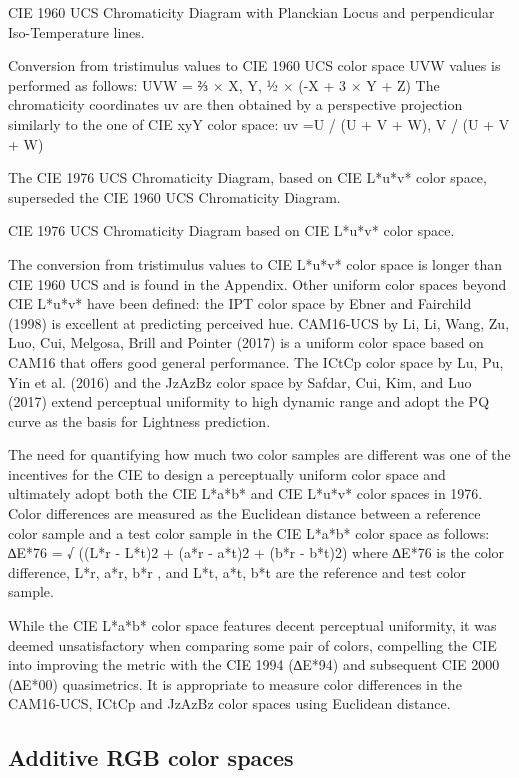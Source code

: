 CIE 1960 UCS Chromaticity Diagram with Planckian Locus and perpendicular Iso-Temperature lines.

Conversion from tristimulus values to CIE 1960 UCS color space UVW values is performed as follows:
UVW = ⅔ × X, Y, ½ × (-X + 3 × Y + Z)
The chromaticity coordinates uv are then obtained by a perspective projection similarly to the one of CIE xyY color space:
uv =U / (U + V + W), V / (U + V + W)

The CIE 1976 UCS Chromaticity Diagram, based on CIE L*u*v* color space, superseded the CIE 1960 UCS Chromaticity Diagram.

CIE 1976 UCS Chromaticity Diagram based on CIE L*u*v* color space.

The conversion from tristimulus values to CIE L*u*v* color space is longer than CIE 1960 UCS and is found in the Appendix.
Other uniform color spaces beyond CIE L*u*v* have been defined: the IPT color space by Ebner and Fairchild (1998) is excellent at predicting perceived hue. CAM16-UCS by Li, Li, Wang, Zu, Luo, Cui, Melgosa, Brill and Pointer (2017) is a uniform color space based on CAM16 that offers good general performance. The ICtCp color space by Lu, Pu, Yin et al. (2016) and the JzAzBz color space by Safdar, Cui, Kim, and Luo (2017) extend perceptual uniformity to high dynamic range and adopt the PQ curve as the basis for Lightness prediction.

The need for quantifying how much two color samples are different was one of the incentives for the CIE to design a perceptually uniform color space and ultimately adopt both the CIE L*a*b* and CIE L*u*v* color spaces in 1976. Color differences are measured as the Euclidean distance between a reference color sample and a test color sample in the CIE L*a*b* color space as follows:
∆E*76 = √ ((L*r - L*t)2 + (a*r - a*t)2  + (b*r - b*t)2)
where ∆E*76 is the color difference, L*r, a*r, b*r , and L*t, a*t, b*t are the reference and test color sample. 

While the CIE L*a*b* color space features decent perceptual uniformity, it was deemed unsatisfactory when comparing some pair of colors, compelling the CIE into improving the metric with the CIE 1994 (∆E*94) and subsequent CIE 2000  (∆E*00)  quasimetrics. It is appropriate to measure color differences in the CAM16-UCS, ICtCp and JzAzBz color spaces using Euclidean distance.

\subsection{Additive RGB color spaces}

